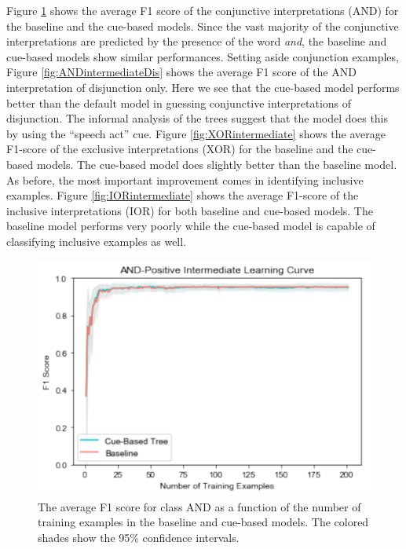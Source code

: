 \documentclass[,man,floatsintext]{apa6}
\begin{document}
Figure \ref{fig:ANDintermediate} shows the average F1 score of the conjunctive interpretations (AND) for the baseline and the cue-based models. Since the vast majority of the conjunctive interpretations are predicted by the presence of the word \emph{and}, the baseline and cue-based models show similar performances. Setting aside conjunction examples, Figure \ref{fig:ANDintermediateDis} shows the average F1 score of the AND interpretation of disjunction only. Here we see that the cue-based model performs better than the default model in guessing conjunctive interpretations of disjunction. The informal analysis of the trees suggest that the model does this by using the \enquote{speech act} cue. Figure \ref{fig:XORintermediate} shows the average F1-score of the exclusive interpretations (XOR) for the baseline and the cue-based models. The cue-based model does slightly better than the baseline model. As before, the most important improvement comes in identifying inclusive examples. Figure \ref{fig:IORintermediate} shows the average F1-score of the inclusive interpretations (IOR) for both baseline and cue-based models. The baseline model performs very poorly while the cue-based model is capable of classifying inclusive examples as well.

\begin{figure}
\centering
\includegraphics{figs/ANDintermediate-1.pdf}
\caption{\label{fig:ANDintermediate}The average F1 score for class AND as a function of the number of training examples in the baseline and cue-based models. The colored shades show the 95\% confidence intervals.}
\end{figure}
\end{document}
